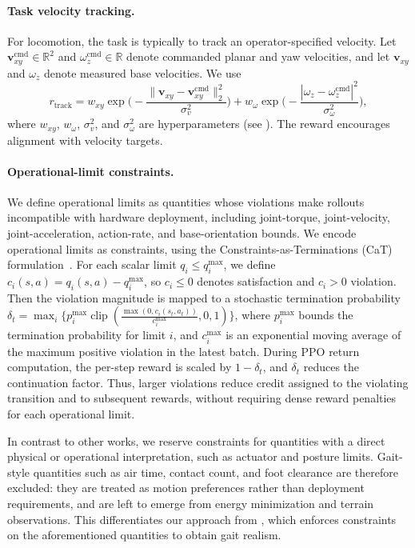 \documentclass{article}
\begin{document}
    \paragraph{Task velocity tracking.} For locomotion, the task is typically to track an operator-specified velocity.
    Let \(\mathbf{v}_{xy}^{\mathrm{cmd}}\in\mathbb{R}^2\) and \(\omega_z^{\mathrm{cmd}}\in\mathbb{R}\) denote commanded planar and yaw velocities, and let \(\mathbf{v}_{xy}\) and \(\omega_z\) denote measured base velocities. We use
    \begin{equation}
        r_{\mathrm{track}} =
        w_{xy}\exp\!\Big(-\frac{\|\mathbf{v}_{xy}
        	-\mathbf{v}_{xy}^{\mathrm{cmd}}\|_2^2}{\sigma_v^2}\Big)
        + w_{\omega}\exp\!\Big(-\frac{|\omega_z
        	-\omega_z^{\mathrm{cmd}}|^2}{\sigma_{\omega}^2}\Big),
    \end{equation}
    where \(w_{xy}\), \(w_\omega\), \(\sigma_v^2\), and \(\sigma_\omega^2\) are hyperparameters (see ). The reward encourages alignment with velocity targets.
    
    \paragraph{Operational-limit constraints.}
    We define operational limits as quantities whose violations  make rollouts incompatible with hardware deployment, including joint-torque, joint-velocity, joint-acceleration, action-rate, and base-orientation bounds.
    We encode operational limits as constraints, using the Constraints-as-Terminations (CaT) formulation~\citep{chane-saneCaTConstraintsTerminations2024a}.
    For each scalar limit $q_i\le q_i^{\max}$, we define $c_i(s,a)=q_i(s,a)-q_i^{\max}$, so $c_i\le0$ denotes satisfaction and $c_i>0$ violation.
    Then the violation magnitude is mapped to a stochastic termination probability $\delta_t = \max_i \{ p_i^{\max} \operatorname{clip} (\tfrac{\max(0,c_i(s_t,a_t))}{c_i^{\max}}, 0, 1)\}$, where $p_i^{\max}$ bounds the termination probability for limit $i$, and $c_i^{\max}$ is an exponential moving average of the maximum positive violation in the latest batch.
    During PPO return computation, the per-step reward is scaled by $1-\delta_t$, and $\delta_t$ reduces the continuation factor.
    Thus, larger violations reduce credit assigned to the violating transition and to subsequent rewards, without requiring dense reward penalties for each operational limit.
    
    In contrast to other works, we reserve constraints for quantities with a direct physical or operational interpretation, such as actuator and posture limits. Gait-style quantities such as air time, contact count, and foot clearance are therefore excluded: they are treated as motion preferences rather than deployment requirements, and are left to emerge from energy minimization and terrain observations. This differentiates our approach from \citet{chane-saneCaTConstraintsTerminations2024a}, which enforces constraints on the aforementioned quantities to obtain gait realism.
    
\end{document}
